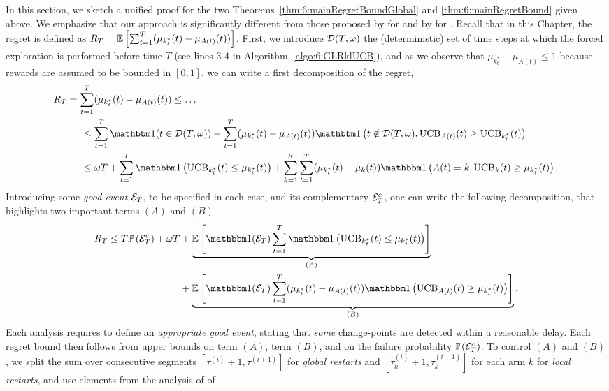 In this section, we sketch a unified proof for the two Theorems~\ref{thm:6:mainRegretBoundGlobal} and \ref{thm:6:mainRegretBound} given above.
We emphasize that our approach is significantly different from those proposed by \cite{CaoZhenKvetonXie18} for \MUCB{} and by \cite{LiuLeeShroff17} for \CUSUMUCB.
%
Recall that in this Chapter, the regret is defined as $R_T \overset{.}{=} \mathbb{E}\left[\sum_{t=1}^T(\mu_{k_t^*}(t) - \mu_{A(t)}(t))\right]$.
First, we introduce $\mathcal{D}(T,\omega)$ the (deterministic) set of time steps at which the forced exploration is performed before time $T$ (see lines $3$-$4$ in Algorithm~\ref{algo:6:GLRklUCB}),
and as we observe that $\mu_{k_t^*} - \mu_{A(t)} \leq 1$ because rewards are assumed to be bounded in $[0,1]$,
we can write a first decomposition of the regret,
\begin{align*}
    & R_T = \sum_{t=1}^T (\mu_{k_t^*}(t) - \mu_{A(t)}(t)) \leq \ldots \\
    & \hspace{1cm} \leq  \sum_{t=1}^{T} \indic(t \in \cD(T,\omega)) + \sum_{t=1}^T (\mu_{k_t^*}(t) - \mu_{A(t)}(t))\indic\left(t \notin\cD(T,\omega), \UCB_{A(t)}(t) \geq \UCB_{k_t^*}(t)\right) \\
    & \hspace{1cm}\leq  \omega T + \sum_{t=1}^T \indic\left(\UCB_{k_t^*}(t) \leq \mu_{k_t^*}(t)\right) + \sum_{k=1}^K\sum_{t=1}^T (\mu_{k_t^*}(t) - \mu_k(t))\indic\left(A(t) = k, \UCB_k(t) \geq \mu_{k_t^*}(t)\right).
\end{align*}
%
Introducing some \emph{good event} $\mathcal{E}_T$, to be specified in each case, and its complementary $\mathcal{E}_T^c$, one can write the following decomposition, that highlights two important terms $(A)$ and $(B)$
%
\begin{align}\label{eq:6:GeneRegretBound}
    R_T \leq T \bP\left(\cE_T^c\right) + \omega T & + \underbrace{\bE\left[\indic(\cE_T) \sum_{t=1}^T \indic\left(\UCB_{k_t^*}(t) \leq \mu_{k_t^*}(t)\right)\right]}_{(A)} \\
    & + \underbrace{\bE\left[\indic(\cE_T)\sum_{t=1}^T (\mu_{k_t^*}(t) - \mu_{A(t)}(t))\indic\left(\UCB_{A(t)}(t) \geq \mu_{k_t^*}(t)\right)\right]}_{(B)}. \nonumber
\end{align}
%
Each analysis requires to define an \emph{appropriate good event}, stating that \emph{some} change-points are detected within a reasonable delay. Each regret bound then follows from upper bounds on term $(A)$, term $(B)$, and on the failure probability $\mathbb{P}(\mathcal{E}_T^c)$.
%
To control $(A)$ and $(B)$, we split the sum over consecutive segments $[\tau^{(i)}+1, \tau^{(i+1)}]$ for \emph{global restarts} and $[\tau^{(i)}_k+1, \tau^{(i+1)}_k]$ for each arm $k$ for \emph{local restarts}, and use elements from the analysis of \klUCB{} of \cite{KLUCBJournal}.

